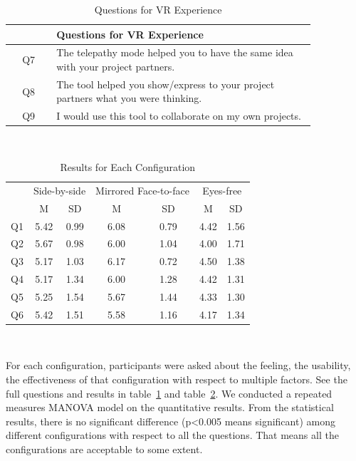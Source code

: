 \documentclass[chi_draft]{sigchi}
\begin{document}
\begin{table}
 \centering
 \begin{tabular}{c p{0.85\linewidth}}
    \toprule
    & Questions for VR Experience\\
    \midrule
    Q7 & The telepathy mode helped you to have the same idea with your project partners.\\
    Q8 & The tool helped you show/express to your project partners what you were thinking.\\
    Q9 & I would use this tool to collaborate on my own projects.\\
    \bottomrule
 \end{tabular}
 \caption{Questions for VR Experience}~\label{tab:questions}
\end{table}

\begin{table}[h]
 \centering
 \begin{tabular}{c c c c c c c}
    \toprule
     & \multicolumn{2}{c}{Side-by-side} & \multicolumn{2}{c}{Mirrored Face-to-face} & \multicolumn{2}{c}{Eyes-free}\\
     & M & SD & M & SD & M & SD\\
    Q1 & 5.42 &0.99 & 6.08 &0.79 & 4.42 &1.56\\
    Q2 & 5.67 &0.98 & 6.00 &1.04 & 4.00 &1.71\\
    Q3 & 5.17 &1.03 & 6.17 &0.72 & 4.50 &1.38\\
    Q4 & 5.17 &1.34 & 6.00 &1.28 & 4.42 &1.31\\
    Q5 & 5.25 &1.54 & 5.67 &1.44 & 4.33 &1.30\\
    Q6 & 5.42 &1.51 & 5.58 &1.16 & 4.17 &1.34\\
    \bottomrule
 \end{tabular}
 \caption{Results for Each Configuration}~\label{tab:results}
\end{table}

For each configuration, participants were asked about the feeling, the usability, the effectiveness of that configuration with respect to multiple factors. See the full questions and results in table~\ref{tab:questions} and table~\ref{tab:results}. We conducted a repeated measures MANOVA model on the quantitative results. From the statistical results, there is no significant difference (p<0.005 means significant) among different configurations with respect to all the questions. That means all the configurations are acceptable to some extent.
\end{document}
